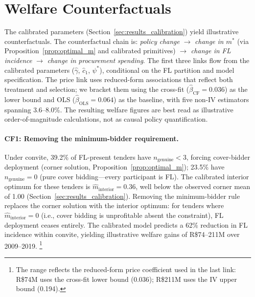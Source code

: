 
\section{Welfare Counterfactuals}
\label{sec:counterfactual}

The calibrated parameters (Section~\ref{sec:results_calibration})
yield illustrative counterfactuals. The counterfactual chain is:
\emph{policy change} $\to$ \emph{change in $m^*$} (via
Proposition~\ref{prop:optimal_m} and calibrated primitives) $\to$
\emph{change in FL incidence} $\to$ \emph{change in procurement
spending}. The first three links flow from the calibrated parameters
($\hat{\gamma}$, $\hat{c}_1$, $\psi^*$), conditional on the FL
partition and model specification. The price link uses reduced-form
associations that reflect both treatment and selection; we bracket
them using the cross-fit ($\hat{\beta}_{\text{CF}} = 0.036$) as the
lower bound and OLS ($\hat{\beta}_{\text{OLS}} = 0.064$) as the
baseline, with five non-IV estimators spanning 3.6--8.0\%. The
resulting welfare figures are best read as illustrative
order-of-magnitude calculations, not as causal policy
quantification.

\paragraph{CF1: Removing the minimum-bidder requirement.}
Under convite, 39.2\% of FL-present tenders have
$n_{\text{genuine}} < 3$, forcing cover-bidder deployment (corner
solution, Proposition~\ref{prop:optimal_m}); 23.5\% have
$n_{\text{genuine}} = 0$ (pure cover bidding---every participant is
FL). The calibrated interior optimum for these tenders is
$\hat{m}_{\text{interior}} = 0.36$, well below the observed corner
mean of 1.00 (Section~\ref{sec:results_calibration}). Removing the
minimum-bidder rule replaces the corner solution with the interior
optimum: for tenders where $\hat{m}_{\text{interior}} = 0$ (i.e.,
cover bidding is unprofitable absent the constraint), FL deployment
ceases entirely. The calibrated model predicts a 62\% reduction in
FL incidence within convite, yielding illustrative welfare gains of
R\$74--211M over 2009--2019.%
\footnote{The range reflects the reduced-form price coefficient used
in the last link: R\$74M uses the cross-fit lower bound (0.036);
R\$211M uses the IV upper bound (0.194).}


